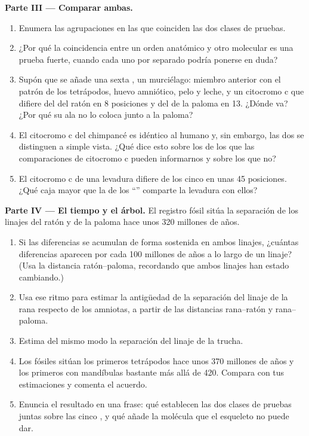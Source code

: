 \begin{problem}
\medskip
\noindent\textbf{Parte III --- Comparar ambas.}
\begin{enumerate}[resume]
  \item Enumera las agrupaciones en las que coinciden las dos clases de
        pruebas.
  \item ¿Por qué la coincidencia entre un orden anatómico y otro
        molecular es una prueba fuerte, cuando cada uno por separado
        podría ponerse en duda?
  \item Supón que se añade una sexta , un murciélago: miembro
        anterior con el patrón de los tetrápodos, huevo amniótico, pelo
        y leche, y un citocromo c que difiere del del ratón en 8
        posiciones y del de la paloma en 13. ¿Dónde va? ¿Por qué su ala
        no lo coloca junto a la paloma?
  \item El citocromo c del chimpancé es idéntico al humano y, sin
        embargo, las dos  se distinguen a simple vista. ¿Qué
        dice esto sobre los  de los que las comparaciones de
        citocromo c pueden informarnos y sobre los que no?
  \item El citocromo c de una levadura difiere de los cinco en unas 45
        posiciones. ¿Qué caja mayor que la de los ``''
        comparte la levadura con ellos?
\end{enumerate}

\medskip
\noindent\textbf{Parte IV --- El tiempo y el árbol.}
El registro fósil sitúa la separación de los linajes del ratón y de la
paloma hace unos 320 millones de años.
\begin{enumerate}[resume]
  \item Si las diferencias se acumulan de forma sostenida en ambos
        linajes, ¿cuántas diferencias aparecen por cada 100 millones de
        años a lo largo de un linaje? (Usa la distancia
        ratón--paloma, recordando que ambos linajes han estado
        cambiando.)
  \item Usa ese ritmo para estimar la antigüedad de la separación del
        linaje de la rana respecto de los amniotas, a partir de las
        distancias rana--ratón y rana--paloma.
  \item Estima del mismo modo la separación del linaje de la trucha.
  \item Los fósiles sitúan los primeros tetrápodos hace unos 370
        millones de años y los primeros  con mandíbulas
        bastante más allá de 420. Compara con tus estimaciones y
        comenta el acuerdo.
  \item Enuncia el resultado en una frase: qué establecen las dos
        clases de pruebas juntas sobre las cinco , y qué añade
        la molécula que el esqueleto no puede dar.
\end{enumerate}
\end{problem}
